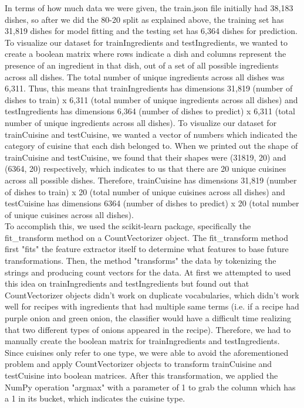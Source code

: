 \documentclass[11pt]{article}
\begin{document}
In terms of how much data we were given, the train.json file initially had
38,183 dishes, so after we did the 80-20 split as explained above, the training set
has 31,819 dishes for model fitting and the testing set has 6,364 dishes for prediction. To
visualize our dataset for trainIngredients and testIngredients, we wanted to create a boolean matrix where rows indicate
a dish and columns represent the presence of an ingredient in that dish, out of
a set of all possible ingredients across all dishes. The total number of unique
ingredients across all dishes was 6,311. Thus, this means that
trainIngredients has dimensions 31,819 (number of dishes to train) x 6,311 (total
number of unique ingredients across all dishes) and testIngredients has dimensions
6,364 (number of dishes to predict) x 6,311 (total
number of unique ingredients across all dishes). To visualize our dataset
for trainCuisine and testCuisine, we wanted a vector of numbers which indicated
the category of cuisine that each dish belonged to. When we printed out the shape
of trainCuisine and testCuisine, we found that their shapes were (31819, 20)
and (6364, 20) respectively, which indicates to us that there are 20 unique cuisines
across all possible dishes. Therefore, trainCuisine has dimensions 31,819
(number of dishes to train) x 20 (total number of unique cuisines across all dishes)
and testCuisine has dimensions 6364
(number of dishes to predict) x 20 (total number of unique cuisines across all dishes). \\

To accomplish this, we used the scikit-learn package, specifically the fit\_transform
method on a CountVectorizer object. The fit\_transform method first "fits" the
feature extractor itself to determine what features to base future transformations.
Then, the method "transforms" the data by tokenizing the strings and producing
count vectors for the data. At first
we attempted to used this idea on trainIngredients and testIngredients but found
out that CountVectorizer objects didn't work on duplicate vocabularies, which
didn't work well for recipes with ingredients that had multiple same terms (i.e. if a
recipe had purple onion and green onion, the classifier would have a difficult time
realizing that two different types of onions appeared in the recipe). Therefore,
we had to manually create the boolean matrix for trainIngredients and testIngredients.
Since cuisines only refer to one type, we were able
to avoid the aforementioned problem and apply CountVectorizer objects to transform
trainCuisine and testCuisine into boolean matrices. After this transformation, we
applied the NumPy operation "argmax" with a parameter of 1 to grab the column
which has a 1 in its bucket, which indicates the cuisine type. \\
\end{document}

